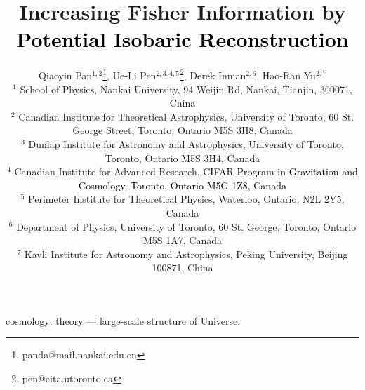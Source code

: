 \documentclass[fleqn,useAMS,usenatbib]{mnras}
\newcommand{\tcr}{\textcolor{black}}
\begin{document}
\title[Information increase by \tcr{PI Reconstruction}]
{Increasing Fisher Information by \tcr{Potential Isobaric Reconstruction}}
\author[Pan et al.]
{Qiaoyin Pan$^{1,2}$\thanks{panda@mail.nankai.edu.cn},
Ue-Li Pen$^{2,3,4,5}$\thanks{pen@cita.utoronto.ca},
Derek Inman$^{2,6}$,
Hao-Ran Yu$^{2,7}$\\
$^{1}$ School of Physics, Nankai University, 94 Weijin Rd, Nankai, Tianjin, 300071, China\\
$^{2}$ Canadian Institute for Theoretical Astrophysics, University of Toronto, 60 St. George Street, Toronto, Ontario M5S 3H8, Canada\\
$^{3}$ Dunlap Institute for Astronomy and Astrophysics, University of Toronto, Toronto, Ontario M5S 3H4, Canada\\
$^{4}$ Canadian Institute for Advanced Research, \tcr{CIFAR Program in Gravitation and Cosmology, Toronto, Ontario M5G 1Z8, Canada}\\
$^{5}$ Perimeter Institute for Theoretical Physics, Waterloo, Ontario, N2L 2Y5, Canada\\
$^{6}$ Department of Physics, University of Toronto, 60 St. George, Toronto, Ontario M5S 1A7, Canada\\
$^{7}$ Kavli Institute for Astronomy and Astrophysics, Peking University, Beijing 100871, China}

\pagerange{\pageref{firstpage}--\pageref{lastpage}} 
\maketitle
\label{firstpage}



\begin{keywords}
  cosmology: theory --- large-scale structure of Universe.
\end{keywords}
















\bsp	%
\label{lastpage}
\end{document}
